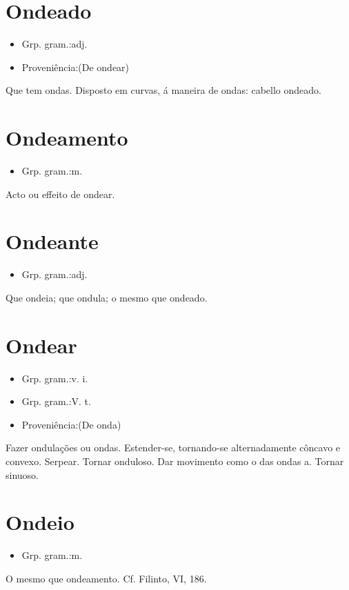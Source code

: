 \section{Ondeado}
\begin{itemize}
\item {Grp. gram.:adj.}
\end{itemize}
\begin{itemize}
\item {Proveniência:(De \textunderscore ondear\textunderscore )}
\end{itemize}
Que tem ondas.
Disposto em curvas, á maneira de ondas: \textunderscore cabello ondeado\textunderscore .
\section{Ondeamento}
\begin{itemize}
\item {Grp. gram.:m.}
\end{itemize}
Acto ou effeito de ondear.
\section{Ondeante}
\begin{itemize}
\item {Grp. gram.:adj.}
\end{itemize}
Que ondeia; que ondula; o mesmo que \textunderscore ondeado\textunderscore .
\section{Ondear}
\begin{itemize}
\item {Grp. gram.:v. i.}
\end{itemize}
\begin{itemize}
\item {Grp. gram.:V. t.}
\end{itemize}
\begin{itemize}
\item {Proveniência:(De \textunderscore onda\textunderscore )}
\end{itemize}
Fazer ondulações ou ondas.
Estender-se, tornando-se alternadamente côncavo e convexo.
Serpear.
Tornar onduloso.
Dar movimento como o das ondas a.
Tornar sinuoso.
\section{Ondeio}
\begin{itemize}
\item {Grp. gram.:m.}
\end{itemize}
O mesmo que \textunderscore ondeamento\textunderscore . Cf. Filinto, VI, 186.
